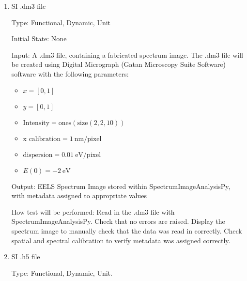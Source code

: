 \documentclass[12pt, titlepage]{article}
\newcommand{\progname}{SpectrumImageAnalysisPy}
\begin{document}
\begin{enumerate}
How test will be performed: Create a 3D data array and attempt to initialize a
spectrum image in \progname{}. No errors should be raised. The spectrum image
axes should be read in the correct order (x, y, E), and the calibrations should
be applied to the correct axes.


\item{SI .dm3 file}

Type: Functional, Dynamic, Unit

Initial State: None

Input: A .dm3 file, containing a fabricated spectrum image. The .dm3 file will
be created using Digital Micrograph (Gatan Microscopy Suite Software) software
\cite{gatan_inc._gatan_nodate} with the following parameters:
\begin{itemize}
	\item $x = [0, 1]$
	\item $y = [0, 1]$
	\item $\text{Intensity} = \text{ones}(\text{size}(2,2,10))$
	\item $\text{x calibration} = 1\ \si{\nano\metre}/\text{pixel}$
	\item $\text{dispersion} = 0.01\ \si{\electronvolt}/\text{pixel}$
	\item $E(0) = -2\ \si{\electronvolt}$
\end{itemize}

Output: EELS Spectrum Image stored within \progname{}, with metadata assigned to
appropriate values

How test will be performed: Read in the .dm3 file with \progname{}. Check that
no errors are raised. Display the spectrum image to manually check that the data
was read in correctly. Check spatial and spectral calibration to verify metadata
was assigned correctly.



\item{SI .h5 file}

Type: Functional, Dynamic, Unit.


\end{enumerate}
\end{document}
